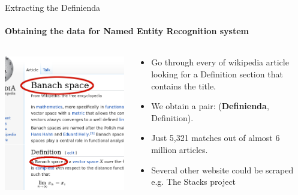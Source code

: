 \documentclass[10pt]{beamer}
\begin{document}
\begin{frame}{Extracting the Definienda}
    \framesubtitle{Obtaining the data for Named Entity Recognition system}
    \begin{columns}[T]
        \begin{column}{0.5\textwidth}
    \includegraphics[width=\textwidth]{wiki_thin_banach.png}
        \end{column}
        \begin{column}{0.5\textwidth}
            \begin{itemize}
            \item Go through every of wikipedia article looking for a Definition section that contains the title.
            \item We obtain a pair: (\textbf{Definienda},  Definition).
            \item Just 5,321 matches out of almost 6 million articles.
            \item Several other website could be scraped e.g. The Stacks project
            \end{itemize}
        \end{column}
    \end{columns}
\end{frame}
\end{document}
